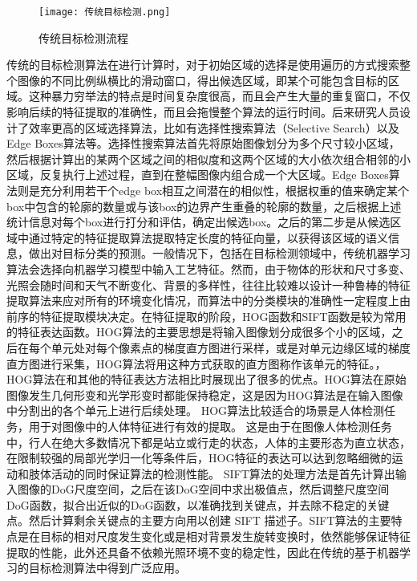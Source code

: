 \begin{figure}[htbp]
    \centering
    \texttt{[image: 传统目标检测.png]}
    \caption{传统目标检测流程}
    \label{ct}
\end{figure}

传统的目标检测算法在进行计算时，对于初始区域的选择是使用遍历的方式搜索整个图像的不同比例纵横比的滑动窗口，得出候选区域，即某个可能包含目标的区域\cite{胡伏原2020基于卷积神经网络的目标检测算法综述,kira1992feature}。这种暴力穷举法的特点是时间复杂度很高，而且会产生大量的重复窗口，不仅影响后续的特征提取的准确性，而且会拖慢整个算法的运行时间。后来研究人员设计了效率更高的区域选择算法，比如有选择性搜索算法（Selective Search）\cite{uijlings2013selective}以及Edge Boxes算法\cite{zitnick2014edge}等。选择性搜索算法首先将原始图像划分为多个尺寸较小区域，然后根据计算出的某两个区域之间的相似度和这两个区域的大小依次组合相邻的小区域，反复执行上述过程，直到在整幅图像内组合成一个大区域。Edge Boxes算法则是充分利用若干个edge box相互之间潜在的相似性，根据权重的值来确定某个box中包含的轮廓的数量或与该box的边界产生重叠的轮廓的数量，之后根据上述统计信息对每个box进行打分和评估，确定出候选box。之后的第二步是从候选区域中通过特定的特征提取算法提取特定长度的特征向量，以获得该区域的语义信息，做出对目标分类的预测。一般情况下，包括在目标检测领域中，传统机器学习算法会选择向机器学习模型中输入工艺特征。然而，由于物体的形状和尺寸多变、光照会随时间和天气不断变化、背景的多样性，往往比较难以设计一种鲁棒的特征提取算法来应对所有的环境变化情况，而算法中的分类模块的准确性一定程度上由前序的特征提取模块决定。在特征提取的阶段，HOG函数\cite{he1990texture}和SIFT函数\cite{lowe1999object}是较为常用的特征表达函数。HOG算法的主要思想是将输入图像划分成很多个小的区域，之后在每个单元处对每个像素点的梯度直方图进行采样，或是对单元边缘区域的梯度直方图进行采集，HOG算法将用这种方式获取的直方图称作该单元的特征。，HOG算法在和其他的特征表达方法相比时展现出了很多的优点。HOG算法在原始图像发生几何形变和光学形变时都能保持稳定，这是因为HOG算法是在输入图像中分割出的各个单元上进行后续处理。
HOG算法比较适合的场景是人体检测任务，用于对图像中的人体特征进行有效的提取。
这是由于在图像人体检测任务中，行人在绝大多数情况下都是站立或行走的状态，人体的主要形态为直立状态，在限制较强的局部光学归一化等条件后，HOG特征的表达可以达到忽略细微的运动和肢体活动的同时保证算法的检测性能。
SIFT算法的处理方法是首先计算出输入图像的DoG尺度空间，之后在该DoG空间中求出极值点，然后调整尺度空间DoG函数，拟合出近似的DoG函数，以准确找到关键点，并去除不稳定的关键点。然后计算剩余关键点的主要方向用以创建 SIFT 描述子。SIFT算法的主要特点是在目标的相对尺度发生变化或是相对背景发生旋转变换时，依然能够保证特征提取的性能，此外还具备不依赖光照环境不变的稳定性，因此在传统的基于机器学习的目标检测算法中得到广泛应用。

